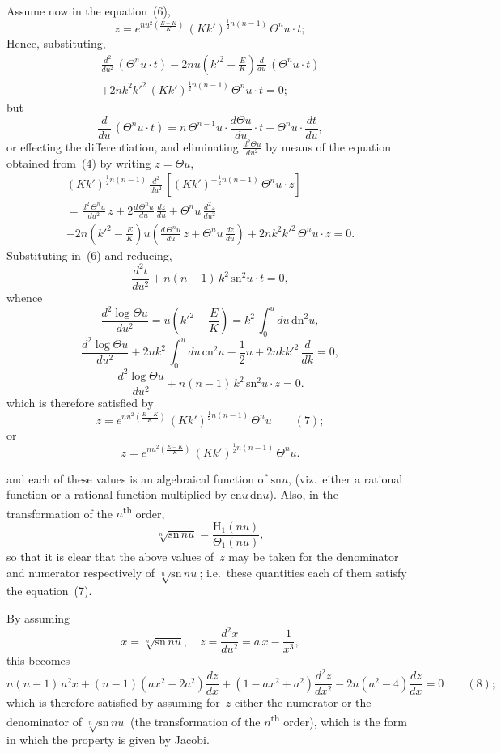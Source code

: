 \documentclass[11pt,a4paper]{article}
\newcommand{\sno}{\mathrm{sn}}
\newcommand{\cno}{\mathrm{cn}}
\newcommand{\dno}{\mathrm{dn}}
\begin{document}
\newpage
Assume now in the equation~(6),
\[
z = e^{nu^2\left(\frac{E-K}{K}\right)} \, (Kk')^{\frac{1}{2}n(n-1)} \, \Theta^n u \cdot t;
\]
Hence, substituting,
\begin{multline*}
\frac{d^2}{du^2}\,(\Theta^n u \cdot t) - 2nu\left(k'^2 - \frac{E}{K}\right)\frac{d}{du}\,(\Theta^n u \cdot t) \\
+ 2nk^2k'^2\,(Kk')^{\frac{1}{2}n(n-1)}\,\Theta^n u \cdot t = 0;
\end{multline*}
but
\[
\frac{d}{du}\,(\Theta^n u \cdot t) = n\,\Theta^{n-1} u \cdot \frac{d\Theta u}{du} \cdot t + \Theta^n u \cdot \frac{dt}{du},
\]
or effecting the differentiation, and eliminating $\frac{d^2\Theta u}{du^2}$ by means of the equation obtained from~(4) by writing $z = \Theta u$,
\begin{multline*}
(Kk')^{\frac{1}{2}n(n-1)} \, \frac{d^2}{du^2}\,[(Kk')^{-\frac{1}{2}n(n-1)}\,\Theta^n u \cdot z] \\
= \frac{d^2\,\Theta^n u}{du^2}\,z + 2\frac{d\,\Theta^n u}{du}\,\frac{dz}{du} + \Theta^n u\,\frac{d^2z}{du^2} \\
- 2n\left(k'^2 - \frac{E}{K}\right)u\left(\frac{d\,\Theta^n u}{du}\,z + \Theta^n u\,\frac{dz}{du}\right) + 2nk^2k'^2\,\Theta^n u \cdot z = 0.
\end{multline*}
Substituting in~(6) and reducing,
\[
\frac{d^2t}{du^2} + n(n-1)\,k^2\,\sno^2 u \cdot t = 0,
\]
whence
\[
\frac{d^2\log\Theta u}{du^2} = u\left(k'^2 - \frac{E}{K}\right) = k^2\,\int_0^u du\,\dno^2 u,
\]
\[
\frac{d^2\log\Theta u}{du^2} + 2nk^2\,\int_0^u du\,\cno^2 u - \frac{1}{2}n + 2nk k'^2\,\frac{d}{dk} = 0,
\]
\[
\frac{d^2\log\Theta u}{du^2} + n(n-1)\,k^2\,\sno^2 u \cdot z = 0.
\]
which is therefore satisfied by
\[
z = e^{nu^2\left(\frac{E-K}{K}\right)} \, (Kk')^{\frac{1}{2}n(n-1)} \, \Theta^n u \qquad(7);
\]
or
\[
z = e^{nu^2\left(\frac{E-K}{K}\right)} \, (Kk')^{\frac{1}{2}n(n-1)} \, \Theta^n u.
\]

\newpage
and each of these values is an algebraical function of $\sno u$, (viz.\ either a rational function or a rational function multiplied by $\cno u\,\dno u$). Also, in the transformation of the $n$\textsuperscript{th} order,
\[
\sqrt[n]{\sno\,nu} = \frac{\mathrm{H}_1(nu)}{\Theta_1(nu)},
\]
so that it is clear that the above values of~$z$ may be taken for the denominator and numerator respectively of $\sqrt[n]{\sno\,nu}$; i.e.\ these quantities each of them satisfy the equation~(7).

By assuming
\[
x = \sqrt[n]{\sno\,nu}, \quad z = \frac{d^2x}{du^2} = a\,x - \frac{1}{x^3},
\]
this becomes
\[
n(n-1)\,a^2x + (n-1)(ax^2 - 2a^2)\frac{dz}{dx} + (1-ax^2+a^2)\frac{d^2z}{dx^2} - 2n(a^2-4)\frac{dz}{dx} = 0 \qquad(8);
\]
which is therefore satisfied by assuming for~$z$ either the numerator or the denominator of $\sqrt[n]{\sno\,nu}$ (the transformation of the $n$\textsuperscript{th} order), which is the form in which the property is given by Jacobi.
\end{document}
